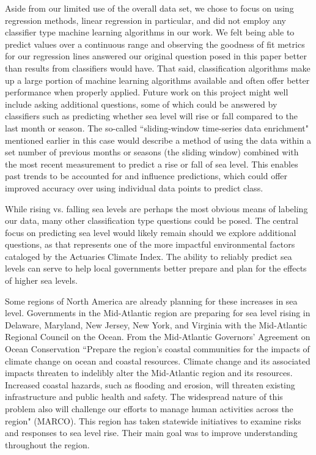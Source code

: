 \documentclass[12pt]{report}
\begin{document}
\par Aside from our limited use of the overall data set, we chose to focus on using regression methods, linear regression in particular, and did not employ any classifier type machine learning algorithms in our work. We felt being able to predict values over a continuous range and observing the goodness of fit metrics for our regression lines answered our original question posed in this paper better than results from classifiers would have. That said, classification algorithms make up a large portion of machine learning algorithms available and often offer better performance when properly applied. Future work on this project might well include asking additional questions, some of which could be answered by classifiers such as predicting whether sea level will rise or fall compared to the last month or season. The so-called \textquotedblleft sliding-window time-series data enrichment" mentioned earlier in this case would describe a method of using the data within a set number of previous months or seasons (the sliding window) combined with the most recent measurement to predict a rise or fall of sea level. This enables past trends to be accounted for and influence predictions, which could offer improved accuracy over using individual data points to predict class.
\par While rising vs. falling sea levels are perhaps the most obvious means of labeling our data, many other classification type questions could be posed. The central focus on predicting sea level would likely remain should we explore additional questions, as that represents one of the more impactful environmental factors cataloged by the Actuaries Climate Index. The ability to reliably predict sea levels can serve to help local governments better prepare and plan for the effects of higher sea levels.
\par Some regions of North America are already planning for these increases in sea level. Governments in the Mid-Atlantic region are preparing for sea level rising in Delaware, Maryland, New Jersey, New York, and Virginia with the Mid-Atlantic Regional Council on the Ocean. From the Mid‐Atlantic Governors' Agreement on Ocean Conservation \textquotedblleft Prepare the region’s coastal communities for the impacts of climate change on ocean and coastal resources. Climate change and its associated impacts threaten to indelibly alter the Mid‐Atlantic region and its resources. Increased coastal hazards, such as flooding and erosion, will threaten existing infrastructure and public health and safety. The widespread nature of this problem also will challenge our efforts to manage human activities across the region" (MARCO). This region has taken statewide initiatives to examine risks and responses to sea level rise. Their main goal was to improve understanding throughout the region. 
\end{document}

